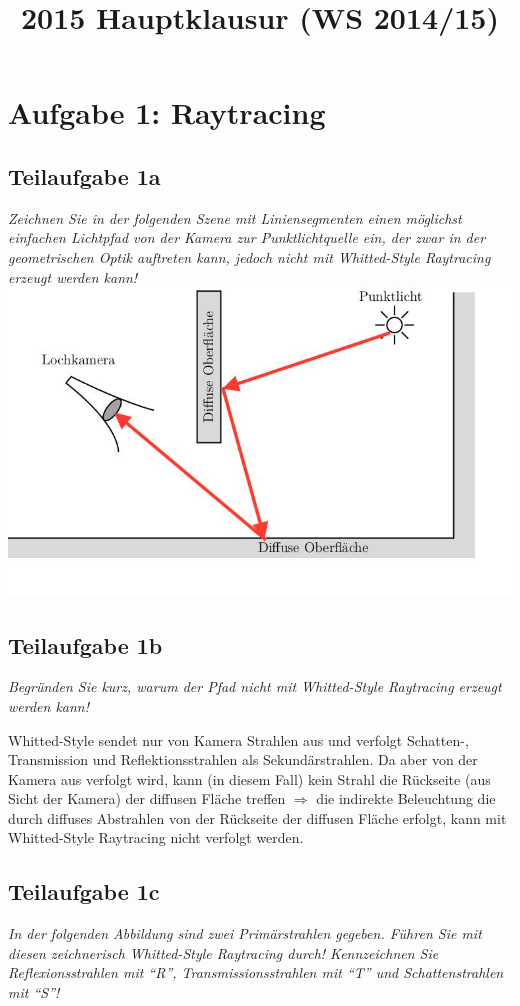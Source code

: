 \documentclass[a4paper]{scrartcl}
\begin{document}
\title{2015 Hauptklausur (WS 2014/15)}

\setcounter{section}{1}
\section*{Aufgabe 1: Raytracing}
\subsection*{Teilaufgabe 1a}
\textit{Zeichnen Sie in der folgenden Szene mit Liniensegmenten einen möglichst einfachen
Lichtpfad von der Kamera zur Punktlichtquelle ein, der zwar in der geometrischen
Optik auftreten kann, jedoch nicht mit Whitted-Style Raytracing erzeugt werden kann!}
\includegraphics*[width=\linewidth, keepaspectratio]{1a.jpg}

\subsection*{Teilaufgabe 1b}
\textit{Begründen Sie kurz, warum der Pfad nicht mit Whitted-Style Raytracing
erzeugt werden kann!}

Whitted-Style sendet nur von Kamera Strahlen aus und verfolgt Schatten-,
Transmission und Reflektionsstrahlen als Sekundärstrahlen. Da aber von der
Kamera aus verfolgt wird, kann (in diesem Fall) kein Strahl die Rückseite (aus
Sicht der Kamera) der diffusen Fläche treffen $\Rightarrow$ die indirekte
Beleuchtung die durch diffuses Abstrahlen von der Rückseite der diffusen Fläche
erfolgt, kann mit Whitted-Style Raytracing nicht verfolgt werden.

\subsection*{Teilaufgabe 1c}
\textit{In der folgenden Abbildung sind zwei Primärstrahlen gegeben. Führen Sie
mit diesen zeichnerisch Whitted-Style Raytracing durch! Kennzeichnen Sie
Reflexionsstrahlen mit \enquote{R}, Transmissionsstrahlen mit \enquote{T} und
Schattenstrahlen mit \enquote{S}!}
\end{document}
